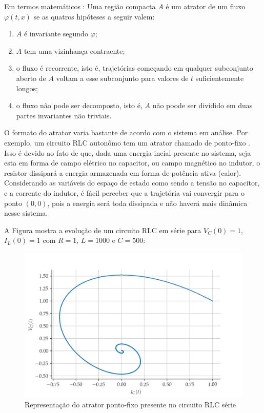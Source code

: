 \documentclass[a4paper, 12pt]{article}
\begin{document}
Em termos matemáticos \cite{fiedler1994caos}: Uma região compacta $A$ é um atrator de um fluxo $\varphi(t, x)$ se as quatros hipóteses a seguir valem:
\begin{enumerate}[label=\alph*)]
	\item $A$ é invariante segundo $\varphi$;
	\item $A$ tem uma vizinhança contraente;
	\item o fluxo é recorrente, isto é, trajetórias começando em qualquer subconjunto aberto de $A$ voltam a esse subconjunto para valores de $t$ suficientemente longos;
	\item o fluxo não pode ser decomposto, isto é, $A$ não poode ser dividido em duas partes invariantes não triviais.
\end{enumerate}

O formato do atrator varia bastante de acordo com o sistema em análise. Por exemplo, um circuito RLC autonômo tem um atrator chamado de ponto-fixo \cite{attux2001dinamica}. Isso é devido ao fato de que, dada uma energia incial presente no sistema, seja esta em forma de campo elétrico no capacitor, ou campo magnético no indutor, o resistor dissipará a energia armazenada em forma de potência ativa (calor). Considerando as variáveis do espaço de estado como sendo a tensão no capacitor, e a corrente do indutor, é fácil perceber que a trajetória vai convergir para o ponto $(0, 0)$, pois a energia será toda dissipada e não haverá mais dinâmica nesse sistema.

A Figura mostra a evolução de um circuito RLC em série para $V_{C}(0) = 1$, $I_{L}(0) = 1$ com $R = 1$, $L = 1000$ e $C = 500$:
\begin{figure}[!ht]
\centering
\includegraphics[scale = 0.7]{rlc-phase-space.png}
\caption{Representação do atrator ponto-fixo presente no circuito RLC série}
\label{fig:rlc-phase-space}
\end{figure}
\end{document}
